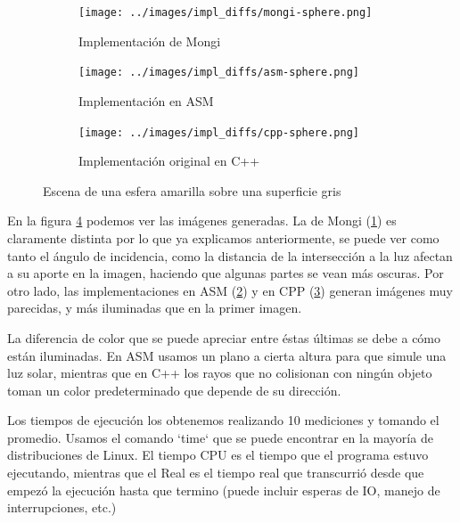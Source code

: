 \begin{figure}
    \centering
    \begin{subfigure}[b]{0.45\textwidth}
        \centering
        \texttt{[image: ../images/impl\_diffs/mongi-sphere.png]}
        \caption{Implementación de Mongi}
        \label{fig:yellow-sphere-mongi}
    \end{subfigure}
    \hfill
    \begin{subfigure}[b]{0.45\textwidth}
        \centering
        \texttt{[image: ../images/impl\_diffs/asm-sphere.png]}
        \caption{Implementación en ASM}
        \label{fig:yellow-sphere-asm}
    \end{subfigure}
    \hfill
    \begin{subfigure}[b]{0.45\textwidth}
        \centering
        \texttt{[image: ../images/impl\_diffs/cpp-sphere.png]}
        \caption{Implementación original en C++}
        \label{fig:yellow-sphere-cpp}
    \end{subfigure}

    \caption{Escena de una esfera amarilla sobre una superficie gris}
    \label{fig:yellow-sphere}
\end{figure}

En la figura \ref{fig:yellow-sphere} podemos ver las imágenes generadas. La de
Mongi (\ref{fig:yellow-sphere-mongi}) es claramente distinta por lo que ya
explicamos anteriormente, se puede ver como tanto el ángulo de incidencia, como
la distancia de la intersección a la luz afectan a su aporte en la imagen,
haciendo que algunas partes se vean más oscuras. Por otro lado, las
implementaciones en ASM (\ref{fig:yellow-sphere-asm}) y en CPP
(\ref{fig:yellow-sphere-cpp}) generan imágenes muy parecidas, y más iluminadas
que en la primer imagen.

La diferencia de color que se puede apreciar entre éstas últimas se debe a cómo
están iluminadas. En ASM usamos un plano a cierta altura para que simule una luz
solar, mientras que en C++ los rayos que no colisionan con ningún objeto toman
un color predeterminado que depende de su dirección.

Los tiempos de ejecución los obtenemos realizando 10 mediciones y tomando el
promedio. Usamos el comando `time` que se puede encontrar en la mayoría de
distribuciones de Linux. El tiempo CPU es el tiempo que el programa estuvo
ejecutando, mientras que el Real es el tiempo real que transcurrió desde que
empezó la ejecución hasta que termino (puede incluir esperas de IO,
manejo de interrupciones, etc.)

